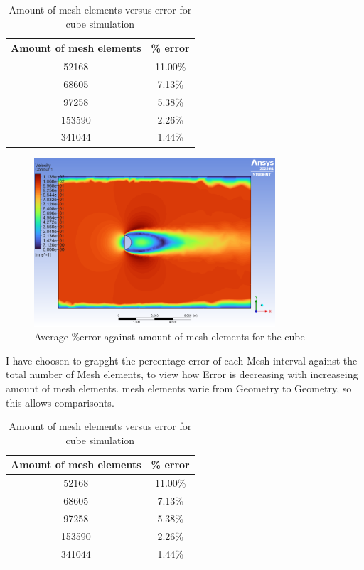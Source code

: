 \documentclass[12pt,a4paper]{article}
\begin{document}
\begin{table}[H]
\centering
\caption{Amount of mesh elements versus error for cube simulation}
\label{tab:cube_elements_error}
\begin{tabular}{|c|c|}
\hline
\rowcolor{lightblue}
\textbf{Amount of mesh elements} & \textbf{\% error} \\
\hline
52168 & 11.00\% \\
\hline
68605 & 7.13\% \\
\hline
97258 & 5.38\% \\
\hline
153590 & 2.26\% \\
\hline
341044 & 1.44\% \\
\hline
\end{tabular}
\end{table}

\begin{figure}[H]
\centering
\includegraphics[width=0.8\textwidth]{image14.png}
\caption{Average \%error against amount of mesh elements for the cube}
\label{fig:cube_elements_error}
\end{figure}

I have choosen to grapght the percentage error of each Mesh interval against the total number of Mesh elements, to view how Error is decreasing with increaseing amount of mesh elements. mesh elements varie from Geometry to Geometry, so this allows comparisonts.

\begin{table}[H]
\centering
\caption{Amount of mesh elements versus error for cube simulation}
\label{tab:cube_elements_error}
\begin{tabular}{|c|c|}
\hline
\rowcolor{lightblue}
\textbf{Amount of mesh elements} & \textbf{\% error} \\
\hline
52168 & 11.00\% \\
\hline
68605 & 7.13\% \\
\hline
97258 & 5.38\% \\
\hline
153590 & 2.26\% \\
\hline
341044 & 1.44\% \\
\hline
\end{tabular}
\end{table}
\end{document}
